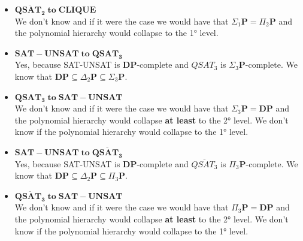 \begin{itemize}
    \item $\mathbf{ \overline{QSAT_2}\; to \;CLIQUE }$\\
    We don't know and if it were the case we would have that $\Sigma_1\mathbf{P}=\Pi_2\mathbf{P}$ and the polynomial hierarchy would collapse to the 1° level.
    \item $\mathbf{SAT-UNSAT \; to \; QSAT_3}$\\
    Yes, because SAT-UNSAT is \textbf{DP}-complete and $QSAT_3$ is $\Sigma_3\mathbf{P}$-complete. We know that $\textbf{DP}\subseteq\Delta_2\mathbf{P}\subseteq\Sigma_3\mathbf{P}$.
    \item $\mathbf{ QSAT_3\; to \;SAT-UNSAT }$\\
    We don't know and if it were the case we would have that $\Sigma_3\mathbf{P}=\textbf{DP}$ and the polynomial hierarchy would collapse \textbf{at least} to the 2° level. We don't know if the polynomial hierarchy would collapse to the 1° level.
    \item $\mathbf{SAT-UNSAT \; to \; \overline{QSAT_3}}$\\
    Yes, because SAT-UNSAT is \textbf{DP}-complete and $\overline{QSAT_3}$ is $\Pi_3\mathbf{P}$-complete. We know that $\textbf{DP}\subseteq\Delta_2\mathbf{P}\subseteq\Pi_3\mathbf{P}$.
    \item $\mathbf{ \overline{QSAT_3}\; to \;SAT-UNSAT }$\\
    We don't know and if it were the case we would have that $\Pi_3\mathbf{P}=\textbf{DP}$ and the polynomial hierarchy would collapse \textbf{at least} to the 2° level. We don't know if the polynomial hierarchy would collapse to the 1° level.
\end{itemize}

